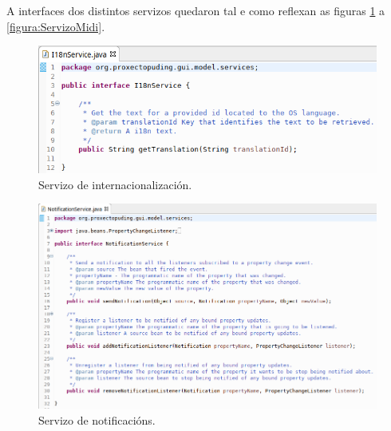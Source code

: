    A interfaces dos distintos servizos quedaron tal e como reflexan as figuras
   \ref{figura:ServizoI18n} a \ref{figura:ServizoMidi}. \\
   
   \begin{figure}[htbp]
    \centering
    \includegraphics[scale=0.6, keepaspectratio=true]{./imagenes/servizo-i18n.png}
    \caption{Servizo de internacionalización.}
    \label{figura:ServizoI18n}
   \end{figure}
   
   \begin{figure}[htbp]
    \centering
    \includegraphics[scale=0.6, keepaspectratio=true]{./imagenes/servizo-notificacions.png}
    \caption{Servizo de notificacións.}
    \label{figura:ServizoNotificacions}
   \end{figure}
   
